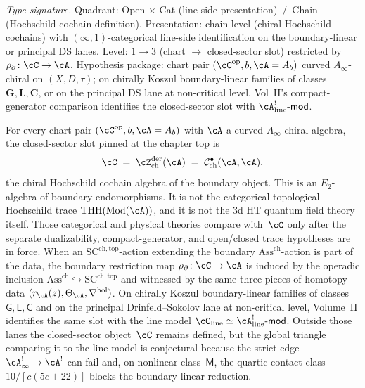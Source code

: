 \begin{proposition}
\label{prop:hdm-upgrade-bulk-slot}
\emph{Type signature.} Quadrant: Open $\times$ Cat (line-side
presentation) $\,/\,$ Chain (Hochschild cochain definition).
Presentation: chain-level (chiral Hochschild cochains) with
$(\infty,1)$-categorical line-side identification on the boundary-linear
or principal DS lanes. Level: $1\to 3$ (chart $\to$ closed-sector slot)
restricted by $\rho_\partial\colon\cC\to\cA$. Hypothesis package:
chart pair $(\cC^{\mathrm{op}}, b, \cA = A_b)$ curved
$A_\infty$-chiral on $(X,D,\tau)$; on chirally Koszul boundary-linear
families of classes $\mathbf{G},\mathbf{L},\mathbf{C}$, or on the
principal DS lane at non-critical level, Vol~II's compact-generator
comparison identifies the closed-sector slot with
$\cA^!_{\mathrm{line}}\text{-}\mathsf{mod}$.

For every chart pair $(\cC^{\mathrm{op}}, b, \cA = A_b)$ with $\cA$
a curved $A_\infty$-chiral algebra, the closed-sector slot pinned
at the chapter top is
\[
\cC
\;=\;
\cZ^{\mathrm{der}}_{\mathrm{ch}}(\cA)
\;=\;
\mathcal{C}^{\bullet}_{\mathrm{ch}}(\cA,\cA),
\]
the chiral Hochschild cochain algebra of the boundary object. This is
an $E_2$-algebra of boundary endomorphisms. It is not the categorical
topological Hochschild trace $\mathrm{THH}(\mathrm{Mod}(\cA))$, and it
is not the $3$d HT quantum field theory itself. Those categorical and
physical theories compare with~$\cC$ only after the separate
dualizability, compact-generator, and open/closed trace hypotheses are
in force. When an
$\mathrm{SC}^{\mathrm{ch,top}}$-action extending the boundary
$\mathrm{Ass}^{\mathrm{ch}}$-action is part of the data, the boundary
restriction map
$\rho_{\partial}\colon \cC \to \cA$ is induced by the operadic
inclusion
$\mathrm{Ass}^{\mathrm{ch}}\hookrightarrow\mathrm{SC}^{\mathrm{ch,top}}$
and witnessed by the same three pieces of homotopy data
$(r_\cA(z),\Theta_\cA,\nabla^{\mathrm{hol}})$. On chirally Koszul
boundary-linear families of classes $\mathsf{G},\mathsf{L},\mathsf{C}$
and on the principal Drinfeld--Sokolov lane at non-critical level,
Volume~II identifies the same slot with the line model
$\cC_{\mathrm{line}}\simeq \cA^!_{\mathrm{line}}\text{-}\mathsf{mod}$.
Outside those lanes the closed-sector object~$\cC$ remains defined, but the
global triangle comparing it to the line model is conjectural because
the strict edge $\cA^{!}_\infty\to\cA^!$ can fail and, on nonlinear
class~$\mathsf{M}$, the quartic contact class $10/[c(5c+22)]$ blocks
the boundary-linear reduction.
\end{proposition}

